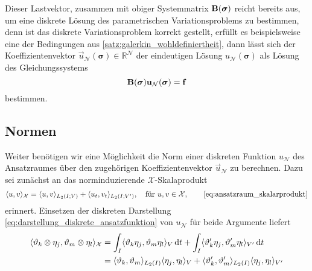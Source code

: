 \documentclass[../main.tex]{subfiles}
\begin{document}
Dieser Lastvektor, zusammen mit obiger Systemmatrix $\mathbf{B}(\bm \sigma)$ reicht bereits aus, um eine diskrete Lösung des parametrischen Variationsproblems zu bestimmen, denn ist das diskrete Variationsproblem korrekt gestellt, erfüllt es beispielsweise eine der Bedingungen aus \cref{satz:galerkin_wohldefiniertheit}, dann lässt sich der Koeffizientenvektor $\vec{u}_{\mathcal N}(\bm \sigma) \in \mathbb{R}^{\mathcal N}$ der eindeutigen Lösung $u_{\mathcal N}(\bm \sigma)$ als Lösung des Gleichungssystems
\begin{equation}
    \mathbf{B}(\bm \sigma) \mathbf{u}_{\mathcal N}(\bm \sigma) = \mathbf{f}
\end{equation}
bestimmen.

\subsection*{Normen}

Weiter benötigen wir eine Möglichkeit die Norm einer diskreten Funktion $u_{\mathcal N}$ des Ansatzraumes über den zugehörigen Koeffizientenvektor $\vec{u}_{\mathcal N}$ zu berechnen.
Dazu sei zunächst an das norminduzierende $\mathcal X$-Skalaprodukt
\begin{equation}
    \skp{u}{v}{\mathcal X} = \skp{u}{v}{L_{2}(I; V)} + \skp{u_t}{v_t}{L_2(I; V')}, \quad \text{für } u, v \in \mathcal X, \tag*{\cref{eq:ansatzraum_skalarprodukt}}
\end{equation}
erinnert.
Einsetzen der diskreten Darstellung \cref{eq:darstellung_diskrete_ansatzfunktion} von $u_{\mathcal N}$ für beide Argumente liefert
\begin{align}
    \langle\vartheta_{k} \otimes \eta_{j},\vartheta_{m} \otimes \eta_{l}\rangle_{\mathcal X}
    &= \int_{I} \langle\vartheta_{k} \eta_{j},\vartheta_{m} \eta_{l}\rangle_{V} \mathop{}\!\mathrm{d} t
        + \int_{I} \langle\vartheta_{k}' \eta_{j},\vartheta_{m}' \eta_{l}\rangle_{V'} \mathop{}\!\mathrm{d} t
    \\&= \langle\vartheta_{k},\vartheta_{m}\rangle_{L_{2}(I)} \langle\eta_{j},\eta_{l}\rangle_{V} + \langle\vartheta_{k}',\vartheta_{m}'\rangle_{L_{2}(I)} \langle\eta_{j},\eta_{l}\rangle_{V'}
\end{align}
\end{document}
